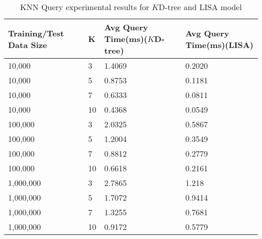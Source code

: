 \begin{table}
	\centering
\centering
	\begin{tabular}{||p{}<{\centering}|p{}<{\centering}|p{}<{\centering}|p{}<{\centering}||}
		\hline
		Training/Test Data Size& K & Avg Query Time(ms)($K$D-tree) & Avg Query Time(ms)(LISA)\\ [0.5ex] 
		\hline
		\hline
	 	10,000& 3& 1.4069 &0.2020 \\
	 	\hline
	 	10,000& 5& 0.8753 &0.1181\\
	 	\hline
	 	10,000& 7& 0.6333 &0.0811 \\
	 	\hline
	 	10,000 & 10& 0.4368 &0.0549 \\
	 	\hline
	 	100,000 & 3& 2.0325 &0.5867 \\
	 	\hline
	 	100,000 & 5& 1.2004 &0.3549 \\
	 	\hline
	 	100,000 & 7& 0.8812 &0.2779 \\
	 	\hline
	 	100,000 & 10&  0.6618 &0.2161 \\
	 	\hline
	    1,000,000 & 3& 2.7865 & 1.218 \\
	 	\hline
	 	1,000,000 & 5& 1.7072 &0.9414 \\
	 	\hline
	 	1,000,000 & 7& 1.3255 &0.7681 \\
	 	\hline
	 	1,000,000 & 10& 0.9172 &0.5779 \\
		\hline
		\hline
	\end{tabular}
	\caption{KNN Query experimental results for $K$D-tree and LISA model}
	\label{KNN_Query_Experimental_Results}

\end{table}



